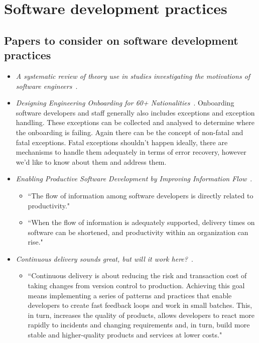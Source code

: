 

\section{Software development practices}
\subsection{Papers to consider on software development practices}
\begin{itemize}
    \item \emph{A systematic review of theory use in studies investigating the motivations of software engineers}~\citep{hall2009systematic}.
    \item \emph{Designing Engineering Onboarding for 60+ Nationalities}~\citep{harty2020_designing_engineering_onboarding}. Onboarding software developers and staff generally also includes exceptions and exception handling. These exceptions can be collected and analysed to determine where the onboarding is failing. Again there can be the concept of non-fatal and fatal exceptions. Fatal exceptions shouldn't happen ideally, there are mechanisms to handle them adequately in terms of error recovery, however we'd like to know about them and address them.
    \item \emph{Enabling Productive Software Development by Improving Information Flow}~\citep{murphy_enabling_2019}. 
    \begin{itemize}
        \item ``The flow of information among software developers is directly related to productivity."
        \item ``When the flow of information is adequately supported, delivery times on software can be shortened, and productivity within an organization can rise."
    \end{itemize}
    \item \emph{Continuous delivery sounds great, but will it work here?}~\citep{humble2018_continuous_delivery_sounds_great}. 
    \begin{itemize}
        \item ``Continuous delivery is about reducing the risk and transaction cost of taking changes from version control to production. Achieving this goal means implementing a series of patterns and practices that enable developers to create fast feedback loops and work in small batches. This, in turn, increases the quality of products, allows developers to react more rapidly to incidents and changing requirements and, in turn, build more stable and higher-quality products and services at lower costs."

\end{itemize}
\end{itemize}
